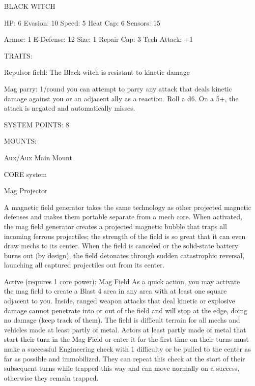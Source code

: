                                              BLACK WITCH 

 HP: 6          Evasion: 10                          Speed: 5           Heat Cap: 6        Sensors: 15 

 Armor: 1       E-Defense: 12                        Size: 1            Repair Cap: 3      Tech Attack:  
                                                                                           +1 

                                                  TRAITS: 

 Repulsor field: The Black witch is resistant to kinetic damage
 
 Mag parry: 1/round you can attempt to parry any attack that deals kinetic damage against you or an  
 adjacent ally as a reaction. Roll a d6. On a 5+, the attack is negated and automatically misses. 

                                            SYSTEM POINTS: 8 

                                                 MOUNTS: 

 Aux/Aux                                             Main Mount 

                                               CORE system 

                                                                                                           


                                                     Mag Projector   

 A magnetic field generator takes the same technology as other projected magnetic defenses and makes  
  them portable separate from a mech core. When activated, the mag field generator creates a projected  
 magnetic bubble that traps all incoming ferrous projectiles; the strength of the field is so great that it can  
 even draw mechs to its center. When the field is canceled or the solid-state battery burns out (by  
 design), the field detonates through sudden catastrophic reversal, launching all captured projectiles out  
 from its center.   

 Active (requires 1 core power): Mag Field  
 As a quick action, you may activate the mag field to create a Blast 4 area in any area with at least one  
  square adjacent to you. Inside, ranged weapon attacks that deal kinetic or explosive damage cannot  
  penetrate into or out of the field and will stop at the edge, doing no damage (keep track of them). The  
 field is difficult terrain for all mechs and vehicles made at least partly of metal. Actors at least partly  
  made of metal that start their turn in the Mag Field or enter it for the first time on their turns must make  
  a successful Engineering check with 1 difficulty or be pulled to the center as far as possible and  
  immobilized. They can repeat this check at the start of their subsequent turns while trapped this way  
  and can move normally on a success, otherwise they remain trapped. 
 
